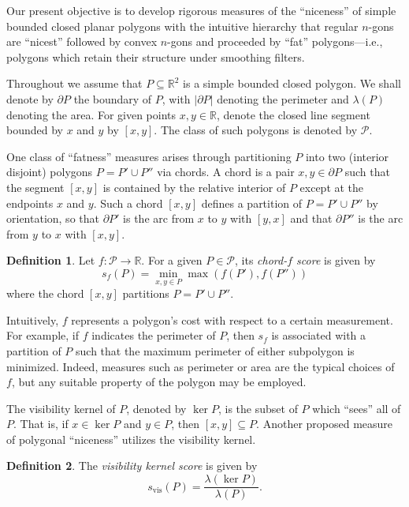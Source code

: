 \documentclass{article}
\newcommand{\RR}{\mathbb{R}}
\newcommand{\abs}[1]{\vert#1\vert}
\theoremstyle{definition}
\newtheorem{definition}{Definition}[section]
\begin{document}
Our present objective is to develop rigorous measures of the ``niceness'' of
simple bounded closed planar polygons with the intuitive hierarchy that regular
$n$-gons are ``nicest'' followed by convex $n$-gons and proceeded by ``fat''
polygons---i.e., polygons which retain their structure under smoothing filters.

Throughout we assume that $P \subseteq \RR^2$ is a simple bounded closed
polygon. We shall denote by $\partial P$ the boundary of $P$, with
$\abs{\partial P}$ denoting the perimeter and $\lambda(P)$ denoting the area.
For given points $x,y \in \RR$, denote the closed line segment bounded by $x$
and $y$ by $[x,y]$.  The class of such polygons is denoted by $\mathcal{P}$.

One class of ``fatness'' measures arises through partitioning $P$ into two
(interior disjoint) polygons $P = P' \cup P''$ via chords.  A chord is a pair
$x,y \in \partial P$ such that the segment $[x,y]$ is contained by the relative
interior of $P$ except at the endpoints $x$ and $y$.  Such a chord $[x,y]$
defines a partition of $P = P' \cup P''$ by orientation, so that $\partial P'$
is the arc from $x$ to $y$ with $[y,x]$ and that $\partial P''$ is the arc from
$y$ to $x$ with $[x,y]$. 

\begin{definition}
  Let $f : \mathcal{P} \to \RR$. For a given $P \in \mathcal{P}$,
  its \emph{chord-$f$ score} is given by
  \begin{equation*}
    s_f(P) = \min_{x,y \in P} \max(f(P'), f(P''))
  \end{equation*}
  where the chord $[x,y]$ partitions $P = P' \cup P''$.
\end{definition}

Intuitively, $f$ represents a polygon's cost with respect to a certain
measurement.  For example, if $f$ indicates the perimeter of $P$, then $s_f$ is
associated with a partition of $P$ such that the maximum perimeter of either
subpolygon is minimized. Indeed, measures such as perimeter or area are the
typical choices of $f$, but any suitable property of the polygon may be
employed.

The visibility kernel of $P$, denoted by $\ker P$, is the subset of $P$ which
``sees'' all of $P$. That is, if $x \in \ker P$ and $y \in P$, then $[x,y]
\subseteq P$. Another proposed measure of polygonal ``niceness'' utilizes the
visibility kernel.

\begin{definition}
  The \emph{visibility kernel score} is given by
  \begin{equation*}
    s_{\textrm{vis}}(P) = \frac{\lambda(\ker P)}{\lambda(P)}.
  \end{equation*}
\end{definition}
\end{document}
